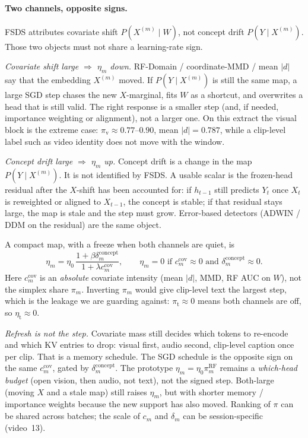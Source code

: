 
\paragraph{Two channels, opposite signs.}
FSDS attributes covariate shift $P(X^{(m)}\mid W)$, not concept drift $P(Y\mid X^{(m)})$.
Those two objects must not share a learning-rate sign.

\emph{Covariate shift large $\Rightarrow$ $\eta_m$ down.}
RF-Domain / coordinate-MMD / mean $|d|$ say that the embedding $X^{(m)}$ moved.
If $P(Y\mid X^{(m)})$ is still the same map, a large SGD step chases the new $X$-marginal, fits $W$ as a shortcut, and overwrites a head that is still valid.
The right response is a smaller step (and, if needed, importance weighting or alignment), not a larger one.
On this extract the visual block is the extreme case: $\pi_{\mathrm{v}}\approx 0.77$--$0.90$, mean $|d|=0.787$, while a clip-level label such as video identity does not move with the window.

\emph{Concept drift large $\Rightarrow$ $\eta_m$ up.}
Concept drift is a change in the map $P(Y\mid X^{(m)})$.
It is not identified by FSDS.
A usable scalar is the frozen-head residual after the $X$-shift has been accounted for: if $h_{t-1}$ still predicts $Y_t$ once $X_t$ is reweighted or aligned to $X_{t-1}$, the concept is stable; if that residual stays large, the map is stale and the step must grow.
Error-based detectors (ADWIN / DDM on the residual) are the same object.

A compact map, with a freeze when both channels are quiet, is
\begin{equation}
  \eta_m
  =
  \eta_0\,
  \frac{1+\beta\delta_m^{\mathrm{concept}}}{1+\lambda c_m^{\mathrm{cov}}},
  \qquad
  \eta_m=0
  \text{ if }
  c_m^{\mathrm{cov}}\approx 0
  \text{ and }
  \delta_m^{\mathrm{concept}}\approx 0.
\end{equation}
Here $c_m^{\mathrm{cov}}$ is an \emph{absolute} covariate intensity (mean $|d|$, MMD, RF AUC on $W$), not the simplex share $\pi_m$.
Inverting $\pi_m$ would give clip-level text the largest step, which is the leakage we are guarding against: $\pi_{\mathrm{t}}\approx 0$ means both channels are off, so $\eta_{\mathrm{t}}\approx 0$.

\emph{Refresh is not the step.}
Covariate mass still decides which tokens to re-encode and which KV entries to drop: visual first, audio second, clip-level caption once per clip.
That is a memory schedule.
The SGD schedule is the opposite sign on the same $c_m^{\mathrm{cov}}$, gated by $\delta_m^{\mathrm{concept}}$.
The prototype $\eta_m=\eta_0\pi_m^{\mathrm{RF}}$ remains a \emph{which-head budget} (open vision, then audio, not text), not the signed step.
Both-large (moving $X$ and a stale map) still raises $\eta_m$, but with shorter memory / importance weights because the new support has also moved.
Ranking of $\pi$ can be shared across batches; the scale of $c_m$ and $\delta_m$ can be session-specific (video~13).
